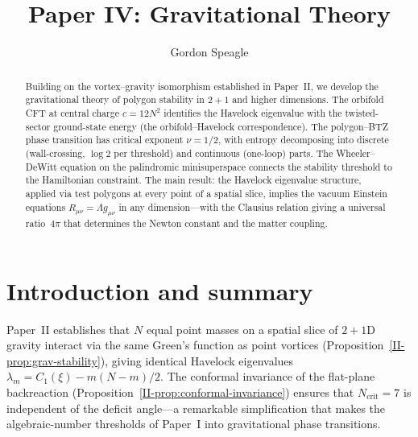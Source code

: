 





\title{\seriestitle\\[6pt]\large Paper IV: Gravitational Theory}
\author{Gordon Speagle}
\date{}


\maketitle

\begin{abstract}
Building on the vortex--gravity isomorphism established in Paper~II,
we develop the gravitational theory of polygon stability in $2{+}1$
and higher dimensions.
The orbifold CFT at central charge $c = 12N^2$ identifies the Havelock
eigenvalue with the twisted-sector ground-state energy
(the orbifold--Havelock correspondence).
The polygon--BTZ phase transition has critical exponent $\nu = 1/2$,
with entropy decomposing into discrete (wall-crossing, $\log 2$ per threshold)
and continuous (one-loop) parts.
The Wheeler--DeWitt equation on the palindromic minisuperspace connects
the stability threshold to the Hamiltonian constraint.
The main result: the Havelock eigenvalue structure, applied via test polygons
at every point of a spatial slice, implies the vacuum Einstein equations
$R_{\mu\nu} = \Lambda g_{\mu\nu}$ in any dimension---with the Clausius relation
giving a universal ratio~$4\pi$ that determines the Newton constant and the
matter coupling.
\end{abstract}

\section{Introduction and summary}
\label{sec:intro-gravity}

Paper~II establishes that $N$ equal point masses on a spatial slice of
$2{+}1$D gravity interact via the same Green's function as point vortices
(Proposition~\ref{II-prop:grav-stability}), giving identical Havelock
eigenvalues $\lambda_m = C_1(\xi) - m(N{-}m)/2$.
The conformal invariance of the flat-plane backreaction
(Proposition~\ref{II-prop:conformal-invariance}) ensures that
$N_{\mathrm{crit}} = 7$ is independent of the deficit angle---a
remarkable simplification that makes the algebraic-number thresholds of
Paper~I into gravitational phase transitions.


